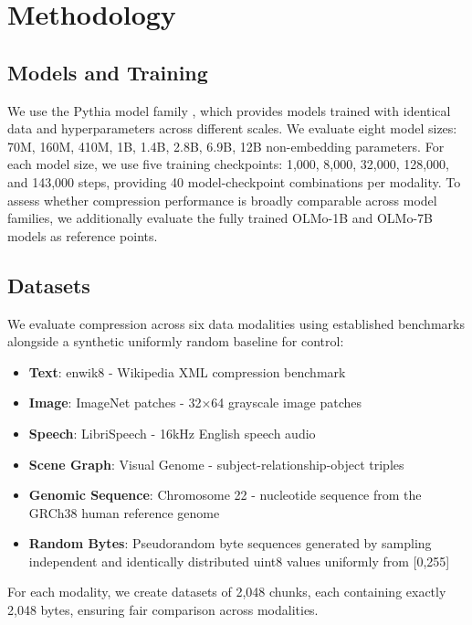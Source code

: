 \documentclass[11pt]{article}
\begin{document}
\section{Methodology}

\subsection{Models and Training}

We use the Pythia model family \citep{biderman2023pythia}, which provides models trained with identical data and hyperparameters across different scales. We evaluate eight model sizes: 70M, 160M, 410M, 1B, 1.4B, 2.8B, 6.9B, 12B non-embedding parameters. For each model size, we use five training checkpoints: 1,000, 8,000, 32,000, 128,000, and 143,000 steps, providing 40 model-checkpoint combinations per modality. To assess whether compression performance is broadly comparable across model families, we additionally evaluate the fully trained OLMo-1B and OLMo-7B models as reference points.

\subsection{Datasets}

We evaluate compression across six data modalities using established benchmarks alongside a synthetic uniformly random baseline for control:
\begin{itemize}
\item \textbf{Text}: enwik8 - Wikipedia XML compression benchmark
\item \textbf{Image}: ImageNet patches - 32×64 grayscale image patches  
\item \textbf{Speech}: LibriSpeech - 16kHz English speech audio
\item \textbf{Scene Graph}: Visual Genome - subject-relationship-object triples
\item \textbf{Genomic Sequence}: Chromosome 22 - nucleotide sequence from the GRCh38 human reference genome
\item \textbf{Random Bytes}: Pseudorandom byte sequences generated by sampling independent and identically distributed uint8 values uniformly from [0,255]

\end{itemize}

For each modality, we create datasets of 2,048 chunks, each containing exactly 2,048 bytes, ensuring fair comparison across modalities.
\end{document}
